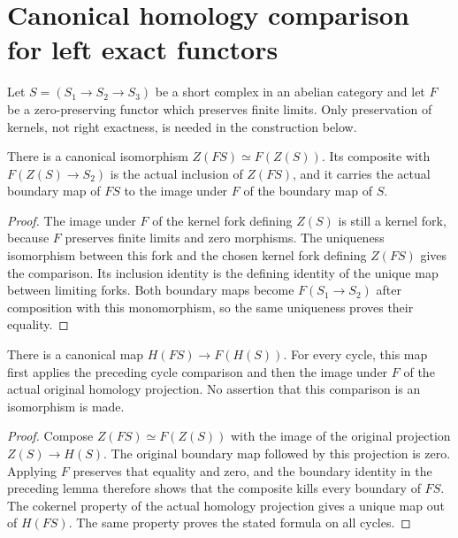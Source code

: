 \section{Canonical homology comparison for left exact functors}
\label{sec:left-exact-homology-comparison}

Let $S=(S_1\to S_2\to S_3)$ be a short complex in an abelian
category and let $F$ be a zero-preserving functor which preserves
finite limits. Only preservation of kernels, not right exactness,
is needed in the construction below.

\begin{lemma}
\label{lem:left-exact-original-cycle-comparison}
\leanok
{}
There is a canonical isomorphism
$Z(FS)\simeq F(Z(S))$. Its composite with $F(Z(S)\to S_2)$
is the actual inclusion of $Z(FS)$, and it carries the actual
boundary map of $FS$ to the image under $F$ of the boundary map
of $S$.
\end{lemma}
\begin{proof}
The image under $F$ of the kernel fork defining $Z(S)$ is still
a kernel fork, because $F$ preserves finite limits and zero
morphisms. The uniqueness isomorphism between this fork and
the chosen kernel fork defining $Z(FS)$ gives the comparison.
Its inclusion identity is the defining identity of the unique
map between limiting forks. Both boundary maps become $F(S_1
\to S_2)$ after composition with this monomorphism, so the
same uniqueness proves their equality.
\end{proof}

\begin{proposition}
\label{prop:left-exact-original-homology-comparison}
\leanok
{}
There is a canonical map $H(FS)\to F(H(S))$. For every cycle,
this map first applies the preceding cycle comparison and then
the image under $F$ of the actual original homology projection.
No assertion that this comparison is an isomorphism is made.
\end{proposition}
\begin{proof}
Compose $Z(FS)\simeq F(Z(S))$ with the image of the original
projection $Z(S)\to H(S)$. The original boundary map followed
by this projection is zero. Applying $F$ preserves that equality
and zero, and the boundary identity in the preceding lemma
therefore shows that the composite kills every boundary of
$FS$. The cokernel property of the actual homology projection
gives a unique map out of $H(FS)$. The same property proves
the stated formula on all cycles.
\end{proof}

